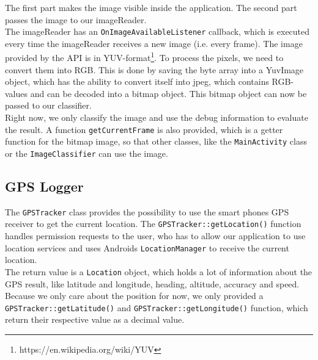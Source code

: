 The first part makes the image visible inside the application. The second part passes the image to our imageReader.\\
The imageReader has an \texttt{OnImageAvailableListener} callback, which is executed every time the imageReader receives a new image (i.e. every frame). The image provided by the API is in YUV-format\footnote{https://en.wikipedia.org/wiki/YUV}. To process the pixels, we need to convert them into RGB. This is done by saving the byte array into a YuvImage object, which has the ability to convert itself into jpeg, which contains RGB-values and can be decoded into a bitmap object. This bitmap object can now be passed to our classifier.\\
Right now, we only classify the image and use the debug information to evaluate the result. A function \texttt{getCurrentFrame} is also provided, which is a getter function for the bitmap image, so that other classes, like the \texttt{MainActivity} class or the \texttt{ImageClassifier} can use the image.

\subsection {GPS Logger}
The \texttt{GPSTracker} class provides the possibility to use the smart phones GPS receiver to get the current location. The \texttt{GPSTracker::getLocation()} function handles permission requests to the user, who has to allow our application to use location services and uses Androids \texttt{LocationManager} to receive the current location.\\
The return value is a \texttt{Location} object, which holds a lot of information about the GPS result, like latitude and longitude, heading, altitude, accuracy and speed. Because we only care about the position for now, we only provided a \texttt{GPSTracker::getLatitude()} and \texttt{GPSTracker::getLongitude()} function, which return their respective value as a decimal value.

